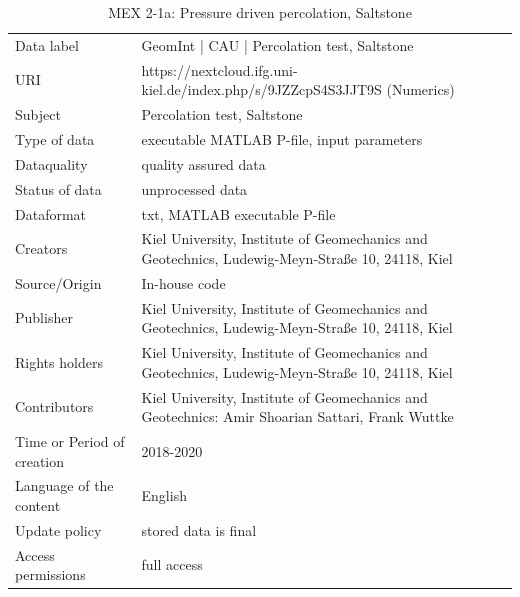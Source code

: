 \begin{table}[!ht]
\caption{MEX 2-1a: Pressure driven percolation, Saltstone}
\label{tab:dms-mex2-1a-cau}
\small
\begin{tabular}{R{3cm}|L{7cm}}
\hline
%
Data label & GeomInt | CAU | Percolation test, Saltstone\\
URI &  https://nextcloud.ifg.uni-kiel.de/index.php/s/9JZZcpS4S3JJT9S (Numerics)
\\
Subject  &  Percolation test, Saltstone\\
Type of data  & executable MATLAB P-file, input parameters\\
Dataquality  &  quality assured data \\
Status of data  &  unprocessed data\\
Dataformat  & txt, MATLAB executable P-file\\
Creators  &  Kiel University, Institute of Geomechanics and Geotechnics, Ludewig-Meyn-Stra\ss e 10, 24118, Kiel\\
Source/Origin & In-house code \\
Publisher  &  Kiel University, Institute of Geomechanics and Geotechnics, Ludewig-Meyn-Stra\ss e 10, 24118, Kiel \\
Rights holders &  Kiel University, Institute of Geomechanics and Geotechnics, Ludewig-Meyn-Stra\ss e 10, 24118, Kiel \\
Contributors &   Kiel University, Institute of Geomechanics and Geotechnics: Amir Shoarian Sattari, Frank Wuttke\\
Time or Period of creation &  2018-2020\\
Language of the content &  English\\
Update policy &  stored data is final\\
Access permissions & full access\\
%
\hline
\end{tabular}
\end{table}